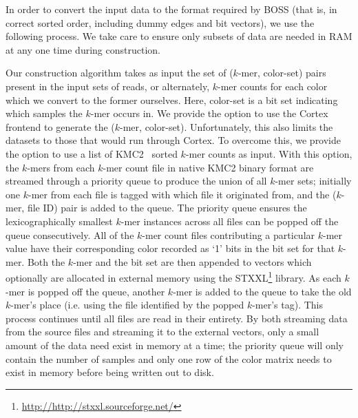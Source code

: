 
In order to convert the input data to the format required by BOSS (that is, in correct sorted order, including dummy edges and bit vectors), we use the following process.  We take care to ensure only subsets of data are needed in RAM at any one time during construction.


Our construction algorithm takes as input the set of ($k$-mer, color-set) pairs present in the input sets of reads, or alternately, $k$-mer counts for each color which we convert to the former ourselves.
Here, color-set is a bit set indicating which samples the $k$-mer occurs in.
We provide the option to use the {\sc Cortex} frontend to generate the ($k$-mer, color-set). Unfortunately, this also limits the datasets to those that would run through {\sc Cortex}.  To overcome this, we provide the option to use a list of KMC2~\citep{KMC2} sorted $k$-mer counts as input.  With this option, the $k$-mers from each $k$-mer count file in native KMC2 binary format are streamed through a priority queue to produce the union of all $k$-mer sets; initially one $k$-mer from each file is tagged with  which file it originated from, and the ($k$-mer, file ID) pair is added to the queue.   The priority queue ensures the lexicographically smallest $k$-mer instances across all files can be popped off the queue consecutively.  All of the $k$-mer count files contributing a particular $k$-mer value have their corresponding color recorded as `1' bits in the bit set for that $k$-mer.  Both the $k$-mer and the bit set are then appended to vectors which optionally are allocated in external memory using the STXXL\footnote{\url{http://http://stxxl.sourceforge.net/}} library.   As each $k$-mer is popped off the queue, another $k$-mer is added to the queue to take the old $k$-mer's place (i.e. using the file identified by the popped $k$-mer's tag).  This process continues until all files are read in their entirety.  By both streaming data from the source files and streaming it to the external vectors, only a small amount of the data need exist in memory at a time; the priority queue will only contain the number of samples and only one row of the color matrix needs to exist in memory before being written out to disk.

